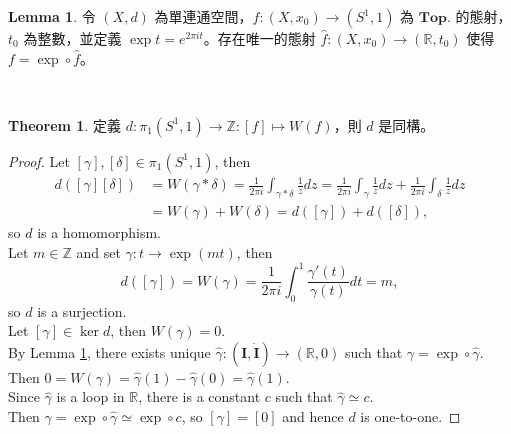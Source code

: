 \documentclass[12pt]{article}
\theoremstyle{definition}
\newtheorem{theorem}[definition]{Theorem}
\newtheorem{lemma}[definition]{Lemma}
\newcommand\<{\langle}
\renewcommand\>{\rangle}
\begin{document}
\begin{CJK}{UTF8}{bsmi}
\begin{lemma}
\label{lemma for pi1S1}
    令 $(X, d)$ 為單連通空間，$f:(X, x_0)\to(S^1, 1)$ 為 $\textbf{Top.}$ 的態射，$t_0$ 為整數，並定義 $\exp t=e^{2\pi it}$。存在唯一的態射 $\hat{f}:(X, x_0)\to(\mathbb{R}, t_0)$ 使得 $f=\exp\circ\hat{f}$。
    \begin{center}
     \\
    \end{center}
\end{lemma}

\begin{theorem}
    定義 $d:\pi_1(S^1, 1)\to\mathbb{Z}:[f]\mapsto W(f)$，則 $d$ 是同構。
\end{theorem}
\begin{proof}
    Let $[\gamma], [\delta]\in\pi_1(S^1, 1)$, then
    \begin{align*}
        d([\gamma][\delta])
        & = W(\gamma*\delta)
          = \frac{1}{2\pi i}\int_{\gamma*\delta}\frac{1}{z}dz 
          = \frac{1}{2\pi i}\int_\gamma\frac{1}{z}dz +\frac{1}{2\pi i}\int_\delta\frac{1}{z}dz \\
        & = W(\gamma)+W(\delta)
          = d([\gamma])+d([\delta]),
    \end{align*}
    so $d$ is a homomorphism. \\
    Let $m\in\mathbb{Z}$ and set $\gamma:t\to\exp(mt)$, then
    \[
        d([\gamma])
        = W(\gamma)
        = \frac{1}{2\pi i}\int_0^1\frac{\gamma'(t)}{\gamma(t)}dt 
        = m,
    \]
    so $d$ is a surjection. \\
    Let $[\gamma]\in\ker d$, then $W(\gamma)=0$. \\
    By Lemma \ref{lemma for pi1S1}, there exists unique $\hat{\gamma}:(\textbf{I}, \Dot{\textbf{I}})\to(\mathbb{R}, 0)$ such that $\gamma=\exp\circ\hat{\gamma}$. \\
    Then $0=W(\gamma)=\hat{\gamma}(1)-\hat{\gamma}(0)=\hat{\gamma}(1)$. \\
    Since $\hat{\gamma}$ is a loop in $\mathbb{R}$, there is a constant $c$ such that $\hat{\gamma}\simeq c$. \\
    Then $\gamma=\exp\circ\hat{\gamma}\simeq\exp\circ c$, so $[\gamma]=[0]$ and hence $d$ is one-to-one.
\end{proof}


\end{CJK}
\end{document}
